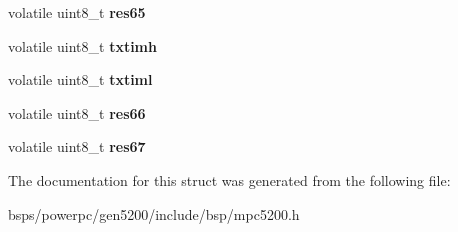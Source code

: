 \begin{DoxyCompactItemize}
volatile uint8\+\_\+t {\bfseries res65}
\item 
\mbox{\label{structmpc5200___1_1mpc5200__mscan_a2de618a04a4db78ba146b2291127c3c4}} 
volatile uint8\+\_\+t {\bfseries txtimh}
\item 
\mbox{\label{structmpc5200___1_1mpc5200__mscan_a3792ac1b8a0ef8ec178621ce472bcd63}} 
volatile uint8\+\_\+t {\bfseries txtiml}
\item 
\mbox{\label{structmpc5200___1_1mpc5200__mscan_af1739160fa06010ea675e013e3127d4f}} 
volatile uint8\+\_\+t {\bfseries res66}
\item 
\mbox{\label{structmpc5200___1_1mpc5200__mscan_a84ce33e679f7250032cedf227bb60b38}} 
volatile uint8\+\_\+t {\bfseries res67}
\end{DoxyCompactItemize}


The documentation for this struct was generated from the following file\+:\begin{DoxyCompactItemize}
\item 
bsps/powerpc/gen5200/include/bsp/mpc5200.\+h\end{DoxyCompactItemize}
